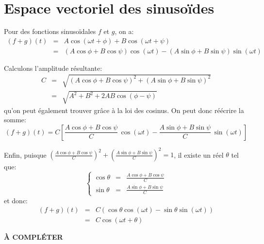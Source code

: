 \section{Espace vectoriel des sinusoïdes}
\label{app:espace-vect-sinus}

Pour des fonctions sinusoïdales $f$ et $g$, on a:
\[
    \begin{array}{rcl}
        (f+g)(t) &=& A\cos(\omega t + \phi) + B\cos(\omega t + \psi) \\
                 &=& (A\cos\phi+B\cos\psi)\cos(\omega t)
                     - (A\sin\phi+B\sin\psi)\sin(\omega t)
    \end{array}
\]

Calculons l'amplitude résultante:
\[
    \begin{array}{rcl}
        C &=& \sqrt{(A\cos\phi+B\cos\psi)^2+(A\sin\phi+B\sin\psi)^2} \\
          &=& \sqrt{A^2+B^2+2AB\cos(\phi-\psi)}
    \end{array}
\]
qu'on peut également trouver grâce à la loi des cosinus.
On peut donc réécrire la somme:
\[
    (f+g)(t) = C\left[ \frac{A\cos\phi+B\cos\psi}{C}\, \cos(\omega t)
                     - \frac{A\sin\phi+B\sin\psi}{C}\, \sin(\omega t) \right]
\]

Enfin, puisque $\left( \frac{A\cos\phi+B\cos\psi}{C} \right)^2
+ \left( \frac{A\sin\phi+B\sin\psi}{C} \right)^2 = 1$,
il existe un réel $\theta$ tel que:
\[
    \left\{
    \begin{array}{rcl}
        \cos\theta &=& \frac{A\cos\phi+B\cos\psi}{C} \\
        \sin\theta &=& \frac{A\sin\phi+B\sin\psi}{C}
    \end{array}
    \right.
\]
et donc:
\[
    \begin{array}{rcl}
        (f+g)(t) &=& C ( \cos\theta\cos(\omega t)
                       - \sin\theta\sin(\omega t) ) \\
                 &=& C\cos(\omega t + \theta)
    \end{array}
\]

\textbf{À COMPLÉTER}
